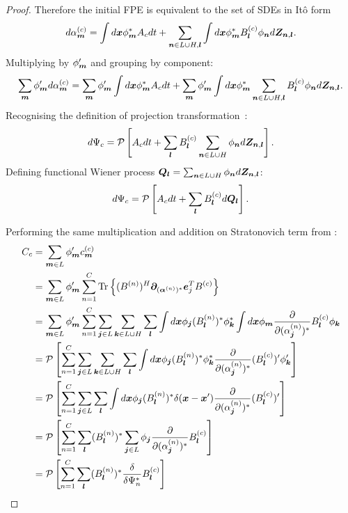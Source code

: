 \begin{proof}
Therefore the initial FPE is equivalent to the set of SDEs in It\^{o} form
\[
	d\alpha_{\boldsymbol{m}}^{(c)}
	= \int d\boldsymbol{x} \phi_{\boldsymbol{m}}^* A_c dt
	+ \sum_{\boldsymbol{n} \in L \cup H, \boldsymbol{l}}
		\int d\boldsymbol{x} \phi_{\boldsymbol{m}}^* B_{\boldsymbol{l}}^{(c)} \phi_{\boldsymbol{n}} d\bm{Z}_{\boldsymbol{n},\boldsymbol{l}}.
\]
Multiplying by $\phi_{\boldsymbol{m}}^\prime$ and grouping by component:
\[
	\sum_{\boldsymbol{m}} \phi_{\boldsymbol{m}}^\prime d\alpha_{\boldsymbol{m}}^{(c)}
	= \sum_{\boldsymbol{m}} \phi_{\boldsymbol{m}}^\prime \int d\boldsymbol{x} \phi_{\boldsymbol{m}}^* A_c dt
	+ \sum_{\boldsymbol{m}} \phi_{\boldsymbol{m}}^\prime \int d\boldsymbol{x} \phi_{\boldsymbol{m}}^*
		\sum_{\boldsymbol{n} \in L \cup H, \boldsymbol{l}} B_{\boldsymbol{l}}^{(c)} \phi_{\boldsymbol{n}} d\bm{Z}_{\boldsymbol{n},\boldsymbol{l}}.
\]
Recognising the definition of projection transformation~:
\[
	d\Psi_c
	= \mathcal{P} \left[
		A_c dt
		+ \sum_{\boldsymbol{l}} B_{\boldsymbol{l}}^{(c)}
			\sum_{\boldsymbol{n} \in L \cup H} \phi_{\boldsymbol{n}} d\bm{Z}_{\boldsymbol{n},\boldsymbol{l}}
	\right].
\]
Defining functional Wiener process $\bm{Q}_{\boldsymbol{l}} = \sum_{\boldsymbol{n} \in L \cup H} \phi_{\boldsymbol{n}} d\bm{Z}_{\boldsymbol{n},\boldsymbol{l}}$:
\[
	d\Psi_c
	= \mathcal{P} \left[
		A_c dt
		+ \sum_{\boldsymbol{l}} B_{\boldsymbol{l}}^{(c)} d\bm{Q}_{\boldsymbol{l}}
	\right].
\]

Performing the same multiplication and addition on Stratonovich term from :
\begin{equation*}
\begin{split}
	C_c
	& = \sum_{\boldsymbol{m} \in L} \phi_{\boldsymbol{m}}^\prime c_{\boldsymbol{m}}^{(c)} \\
	& = \sum_{\boldsymbol{m} \in L} \phi_{\boldsymbol{m}}^\prime \sum_{n=1}^C \mathrm{Tr} \left\{ 
		(B^{(n)})^H \bm{\partial}_{(\bm{\alpha}^{(n)})^*} \bm{e}_j^T B^{(c)}
	 \right\} \\
	& = \sum_{\boldsymbol{m} \in L} \phi_{\boldsymbol{m}}^\prime \sum_{n=1}^C
		\sum_{\boldsymbol{j} \in L} \sum_{\boldsymbol{k} \in L \cup H} \sum_{\boldsymbol{l}}
		\int d\boldsymbol{x} \phi_{\boldsymbol{j}} (B_{\boldsymbol{l}}^{(n)})^* \phi_{\boldsymbol{k}}^*
		\int d\boldsymbol{x} \phi_{\boldsymbol{m}}
			\frac{\partial}{\partial (\alpha_{\boldsymbol{j}}^{(n)})^*} B_{\boldsymbol{l}}^{(c)} \phi_{\boldsymbol{k}} \\
	& = \mathcal{P} \left[
		\sum_{n=1}^C
		\sum_{\boldsymbol{j} \in L} \sum_{\boldsymbol{k} \in L \cup H} \sum_{\boldsymbol{l}}
		\int d\boldsymbol{x} \phi_{\boldsymbol{j}} (B_{\boldsymbol{l}}^{(n)})^* \phi_{\boldsymbol{k}}^*
		\frac{\partial}{\partial (\alpha_{\boldsymbol{j}}^{(n)})^*} (B_{\boldsymbol{l}}^{(c)})^\prime \phi_{\boldsymbol{k}}^\prime
	\right] \\
	& = \mathcal{P} \left[
		\sum_{n=1}^C
		\sum_{\boldsymbol{j} \in L} \sum_{\boldsymbol{l}}
		\int d\boldsymbol{x} \phi_{\boldsymbol{j}} (B_{\boldsymbol{l}}^{(n)})^* \delta(\boldsymbol{x} - \boldsymbol{x}^\prime)
		\frac{\partial}{\partial (\alpha_{\boldsymbol{j}}^{(n)})^*} (B_{\boldsymbol{l}}^{(c)})^\prime
	\right] \\
	& = \mathcal{P} \left[
		\sum_{n=1}^C \sum_{\boldsymbol{l}}
		(B_{\boldsymbol{l}}^{(n)})^*
		\sum_{\boldsymbol{j} \in L}
		\phi_{\boldsymbol{j}} \frac{\partial}{\partial (\alpha_{\boldsymbol{j}}^{(n)})^*} B_{\boldsymbol{l}}^{(c)}
	\right] \\
	& = \mathcal{P} \left[
		\sum_{n=1}^C \sum_{\boldsymbol{l}}
		(B_{\boldsymbol{l}}^{(n)})^*
		\frac{\delta}{\delta \Psi_n^*}
		B_{\boldsymbol{l}}^{(c)}
	\right]
\end{split}
\end{equation*}
\end{proof}


